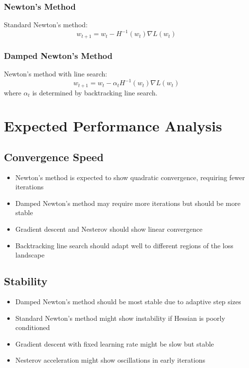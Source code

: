 \documentclass{article}
\begin{document}
\subsubsection{Newton's Method}
Standard Newton's method:
\begin{equation}
    w_{t+1} = w_t - H^{-1}(w_t)\nabla L(w_t)
\end{equation}

\subsubsection{Damped Newton's Method}
Newton's method with line search:
\begin{equation}
    w_{t+1} = w_t - \alpha_t H^{-1}(w_t)\nabla L(w_t)
\end{equation}
where $\alpha_t$ is determined by backtracking line search.

\section{Expected Performance Analysis}
\subsection{Convergence Speed}
\begin{itemize}
    \item Newton's method is expected to show quadratic convergence, requiring fewer iterations
    \item Damped Newton's method may require more iterations but should be more stable
    \item Gradient descent and Nesterov should show linear convergence
    \item Backtracking line search should adapt well to different regions of the loss landscape
\end{itemize}

\subsection{Stability}
\begin{itemize}
    \item Damped Newton's method should be most stable due to adaptive step sizes
    \item Standard Newton's method might show instability if Hessian is poorly conditioned
    \item Gradient descent with fixed learning rate might be slow but stable
    \item Nesterov acceleration might show oscillations in early iterations
\end{itemize}
\end{document}
